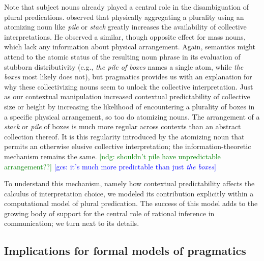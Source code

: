 \documentclass[linguex]{sp}
\newcommand{\ndg}[1]{\textcolor{Green}{[ndg: #1]}}
\newcommand{\gcs}[1]{\textcolor{blue}{[gcs: #1]}}
\begin{document}
Note that subject nouns already played a central role in the disambiguation of plural predications. \cite{schwarzschild2011} observed that physically aggregating a plurality using an atomizing noun like \emph{pile} or \emph{stack} greatly increases the availability of collective interpretations. He observed a similar, though opposite effect for mass nouns, which lack any information about physical arrangement. Again, semantics might attend to the atomic status of the resulting noun phrase in its evaluation of stubborn distributivity (e.g., \emph{the pile of boxes} names a single atom, while \emph{the boxes} most likely does not), but pragmatics provides us with an explanation for why these collectivizing nouns seem to unlock the collective interpretation. Just as our contextual manipulation increased contextual predictability of collective size or height by increasing the likelihood of encountering a plurality of boxes in a specific physical arrangement, so too do atomizing nouns. The arrangement of a \emph{stack} or \emph{pile} of boxes is much more regular across contexts than an abstract collection thereof. It is this regularity introduced by the atomizing noun that permits an otherwise elusive collective interpretation; the information-theoretic mechanism remains the same.
\ndg{shouldn't pile have unpredictable arrangement??} \gcs{it's much more predictable than just \emph{the boxes}}


To understand this mechanism, namely how contextual predictability affects the calculus of interpretation choice, we modeled its contribution explicitly within a computational model of plural predication. The success of this model adds to the growing body of support for the central role of rational inference in communication; we turn next to its details.

\subsection{Implications for formal models of pragmatics}
\end{document}
